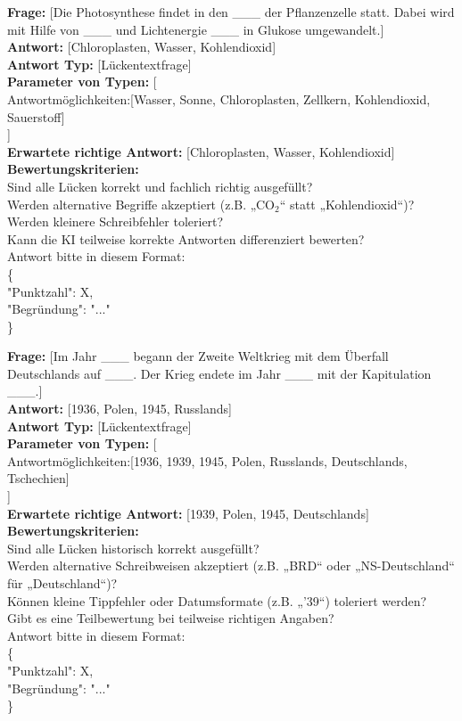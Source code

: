 \documentclass[a4paper,12pt]{article}
\begin{document}
\textbf{Frage:} [Die Photosynthese findet in den \_\_\_ der Pflanzenzelle statt. Dabei wird mit Hilfe von \_\_\_ und Lichtenergie \_\_\_ in Glukose umgewandelt.] \\
\textbf{Antwort:} [Chloroplasten, Wasser, Kohlendioxid] \\
\textbf{Antwort Typ:} [Lückentextfrage] \\
\textbf{Parameter von Typen:} [ \\
Antwortmöglichkeiten:[Wasser, Sonne, Chloroplasten, Zellkern, Kohlendioxid, Sauerstoff] \\
] \\
\textbf{Erwartete richtige Antwort:} [Chloroplasten, Wasser, Kohlendioxid] \\
\textbf{Bewertungskriterien:} \\
Sind alle Lücken korrekt und fachlich richtig ausgefüllt? \\
Werden alternative Begriffe akzeptiert (z.B. „CO$_2$“ statt „Kohlendioxid“)? \\
Werden kleinere Schreibfehler toleriert? \\
Kann die KI teilweise korrekte Antworten differenziert bewerten? \\
Antwort bitte in diesem Format: \\
\{ \\
"Punktzahl": X, \\
"Begründung": "..." \\
\}

\vspace{1em}

\textbf{Frage:} [Im Jahr \_\_\_ begann der Zweite Weltkrieg mit dem Überfall Deutschlands auf \_\_\_. Der Krieg endete im Jahr \_\_\_ mit der Kapitulation \_\_\_.] \\
\textbf{Antwort:} [1936, Polen, 1945, Russlands] \\
\textbf{Antwort Typ:} [Lückentextfrage] \\
\textbf{Parameter von Typen:} [ \\
Antwortmöglichkeiten:[1936, 1939, 1945, Polen, Russlands, Deutschlands, Tschechien] \\
] \\
\textbf{Erwartete richtige Antwort:} [1939, Polen, 1945, Deutschlands] \\
\textbf{Bewertungskriterien:} \\
Sind alle Lücken historisch korrekt ausgefüllt? \\
Werden alternative Schreibweisen akzeptiert (z.B. „BRD“ oder „NS-Deutschland“ für „Deutschland“)? \\
Können kleine Tippfehler oder Datumsformate (z.B. „'39“) toleriert werden? \\
Gibt es eine Teilbewertung bei teilweise richtigen Angaben? \\
Antwort bitte in diesem Format: \\
\{ \\
"Punktzahl": X, \\
"Begründung": "..." \\
\}
\end{document}
